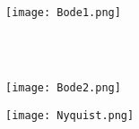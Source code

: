 \newpage


\begin{figure}[h]
\centering
\texttt{[image: Bode1.png]}
\end{figure}

\hfill \\
\hfill \\


\begin{figure}[h]
\centering
\texttt{[image: Bode2.png]}
\end{figure}


\newpage

\begin{figure}[h]
\centering
\texttt{[image: Nyquist.png]}
\end{figure}




